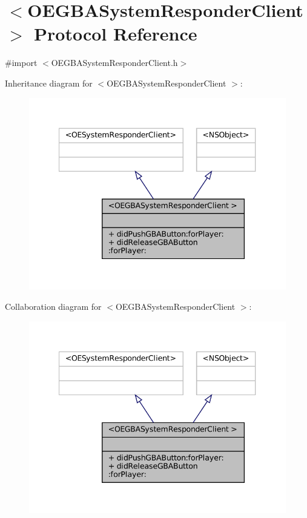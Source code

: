 \hypertarget{protocol_o_e_g_b_a_system_responder_client_01-p}{}\section{$<$O\+E\+G\+B\+A\+System\+Responder\+Client $>$ Protocol Reference}
\label{protocol_o_e_g_b_a_system_responder_client_01-p}


{\ttfamily \#import $<$O\+E\+G\+B\+A\+System\+Responder\+Client.\+h$>$}



Inheritance diagram for $<$O\+E\+G\+B\+A\+System\+Responder\+Client $>$\+:
\nopagebreak
\begin{figure}[H]
\begin{center}
\leavevmode
\includegraphics[width=340pt]{protocol_o_e_g_b_a_system_responder_client_01-p__inherit__graph}
\end{center}
\end{figure}


Collaboration diagram for $<$O\+E\+G\+B\+A\+System\+Responder\+Client $>$\+:
\nopagebreak
\begin{figure}[H]
\begin{center}
\leavevmode
\includegraphics[width=340pt]{protocol_o_e_g_b_a_system_responder_client_01-p__coll__graph}
\end{center}
\end{figure}
